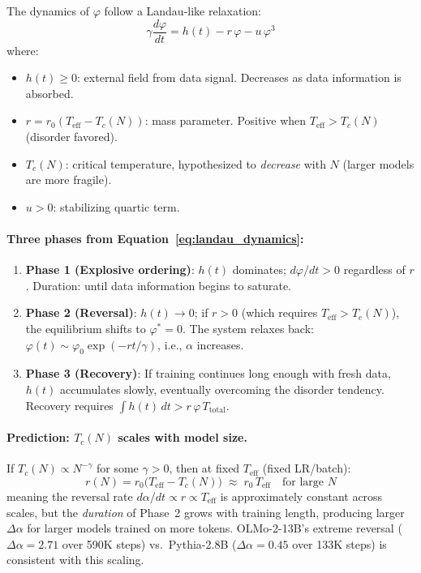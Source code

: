 The dynamics of $\varphi$ follow a Landau-like relaxation:
\begin{equation}
    \gamma\frac{d\varphi}{dt} = h(t) - r\,\varphi - u\,\varphi^3
    \label{eq:landau_dynamics}
\end{equation}
where:
\begin{itemize}[leftmargin=*,itemsep=0pt]
    \item $h(t) \geq 0$: external field from data signal. Decreases as data information is absorbed.
    \item $r = r_0(T_{\mathrm{eff}} - T_c(N))$: mass parameter. Positive when $T_{\mathrm{eff}} > T_c(N)$ (disorder favored).
    \item $T_c(N)$: critical temperature, hypothesized to \emph{decrease} with $N$ (larger models are more fragile).
    \item $u > 0$: stabilizing quartic term.
\end{itemize}

\paragraph{Three phases from Equation~\ref{eq:landau_dynamics}:}
\begin{enumerate}[leftmargin=*,itemsep=1pt]
    \item \textbf{Phase 1 (Explosive ordering)}: $h(t)$ dominates; $d\varphi/dt > 0$ regardless of $r$. Duration: until data information begins to saturate.
    \item \textbf{Phase 2 (Reversal)}: $h(t) \to 0$; if $r > 0$ (which requires $T_{\mathrm{eff}} > T_c(N)$), the equilibrium shifts to $\varphi^* = 0$. The system relaxes back: $\varphi(t) \sim \varphi_0 \exp(-rt/\gamma)$, i.e., $\alpha$ increases.
    \item \textbf{Phase 3 (Recovery)}: If training continues long enough with fresh data, $h(t)$ accumulates slowly, eventually overcoming the disorder tendency. Recovery requires $\int h(t)\,dt > r\,\varphi\,T_{\mathrm{total}}$.
\end{enumerate}

\paragraph{Prediction: $T_c(N)$ scales with model size.}
If $T_c(N) \propto N^{-\gamma}$ for some $\gamma > 0$, then at fixed $T_{\mathrm{eff}}$ (fixed LR/batch):
\begin{equation}
    r(N) = r_0\bigl(T_{\mathrm{eff}} - T_c(N)\bigr) \;\approx\; r_0\,T_{\mathrm{eff}} \quad \text{for large } N
\end{equation}
meaning the reversal rate $d\alpha/dt \propto r \propto T_{\mathrm{eff}}$ is approximately constant across scales, but the \emph{duration} of Phase~2 grows with training length, producing larger $\Delta\alpha$ for larger models trained on more tokens. OLMo-2-13B's extreme reversal ($\Delta\alpha = 2.71$ over 590K steps) vs.\ Pythia-2.8B ($\Delta\alpha = 0.45$ over 133K steps) is consistent with this scaling.

